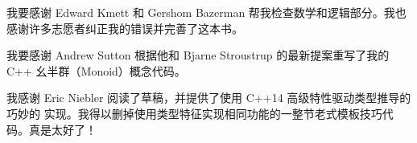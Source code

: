 \noindent
我要感谢 Edward Kmett 和 Gershom Bazerman 帮我检查数学和逻辑部分。我也感谢许多志愿者纠正我的错误并完善了这本书。

\vspace{1.0em}
\noindent
我要感谢 Andrew Sutton 根据他和 Bjarne Stroustrup 的最新提案重写了我的 C++ 幺半群（Monoid）概念代码。

\vspace{1.0em}
\noindent
我感谢 Eric Niebler 阅读了草稿，并提供了使用 C++14 高级特性驱动类型推导的巧妙的  实现。我得以删掉使用类型特征实现相同功能的一整节老式模板技巧代码。真是太好了！